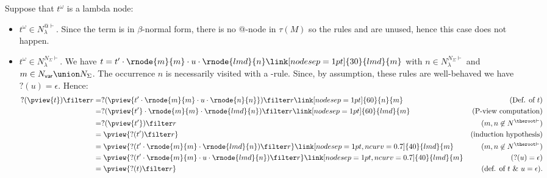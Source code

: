 Suppose that $t^\omega$ is a lambda node:
\begin{itemize}
\item $t^\omega \in N^{@\vdash}_\lambda$. Since the term is in $\beta$-normal form, there is no
    @-node in $\tau(M)$ so the rules  and
     are unused, hence this case does not happen.

\item $t^\omega \in N^{N_\Sigma\vdash}_\lambda$. We have $t =  t' \cdot \rnode{m}{m} \cdot  u \cdot \rnode{lmd}{n}
    \link[nodesep=1pt]{30}{lmd}{m}$ with $n\in N^{N_\Sigma
    \vdash}_\lambda$ and $m \in N_{\sf var} \union N_\Sigma$.
    The occurrence $n$ is necessarily visited with a
    -rule. Since, by assumption, these rules
    are well-behaved we have $?(u) = \epsilon$. Hence:
        \begin{align*}
        ?(\pview{t}) \filter  r
        &= ?(\pview{t' \cdot \rnode{m}{m} \cdot u \cdot \rnode{n}{n}}) \filter  r
               \link[nodesep=1pt]{60}{n}{m}                   & (\mbox{Def. of $t$})\\
        &= ?(\pview{t'} \cdot \rnode{m}{m} \cdot \rnode{lmd}{n} ) \filter  r
               \link[nodesep=1pt]{60}{lmd}{m}                 & (\mbox{P-view computation}) \\
        &= ?(\pview{t'}) \filter  r                & (m, n \not\in N^{\theroot \vdash}) \\
        &= \pview{?(t') \filter  r }               & \mbox{(induction hypothesis)} \\
        &= \pview{ ?(t' \cdot \rnode{m}{m} \cdot \rnode{lmd}{n}) \filter r }
\link[nodesep=1pt,ncurv=0.7]{40}{lmd}{m}                                                          & (m, n \not\in N^{\theroot \vdash}) \\
        &= \pview{ ?(t' \cdot \rnode{m}{m} \cdot u \cdot \rnode{lmd}{n}) \filter r }
\link[nodesep=1pt,ncurv=0.7]{40}{lmd}{m}                                                          & (?(u)=\epsilon) \\
        &= \pview{ ?(t) \filter r }                & \mbox{(def. of $t$ \& $u = \epsilon$).}
        \end{align*}


\end{itemize}
